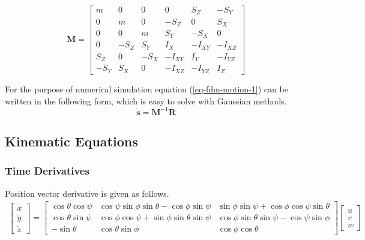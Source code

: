 \begin{equation}
 \boldsymbol M
 =
  \left[
    \begin{matrix}
         m &    0 &    0 &    0    &     S_Z &    -S_Y \\
         0 &    m &    0 & -S_Z    &       0 &     S_X \\
         0 &    0 &    m &  S_Y    &    -S_X &       0 \\
         0 & -S_Z &  S_Y &  I_X    & -I_{XY} & -I_{XZ} \\
       S_Z &    0 & -S_X & -I_{XY} &  I_Y    & -I_{YZ} \\
      -S_Y &  S_X &    0 & -I_{XZ} & -I_{YZ} &  I_Z
    \end{matrix}
  \right]
\end{equation}

For the purpose of numerical simulation equation (\ref{eq-fdm-motion-1}) can be written in the following form, which is easy to solve with Gaussian methods.
\begin{equation}
  \label{eq-fdm-motion-2}
  \dot {\boldsymbol s} = {\boldsymbol M}^{-1} \boldsymbol R
\end{equation}

\subsection{Kinematic Equations}

\subsubsection{Time Derivatives}

Position vector derivative is given as follows. \cite{Allerton2009}
\begin{gather}
  \label{eq-fdm-position-deriv}
  \left[
    \begin{matrix}
      \dot x \\
      \dot y \\
      \dot z
    \end{matrix}
  \right]
  =
    \left[
    \begin{matrix}
       \cos \theta \cos \psi &
       \cos \psi   \sin \phi   \sin \theta - \cos \phi   \sin \psi &
       \sin \phi   \sin \psi + \cos \phi     \cos \psi   \sin \theta \\
       \cos \theta \sin \psi &
       \cos \phi   \cos \psi + \sin \phi     \sin \theta \sin \psi &
       \cos \phi   \sin \theta \sin \psi -   \cos \psi   \sin \phi \\
      -\sin \theta &
       \cos \theta \sin \phi &
       \cos \phi   \cos \theta
    \end{matrix}
  \right]
  \left[
    \begin{matrix}
      u \\
      v \\
      w
    \end{matrix}
  \right]
\end{gather}

